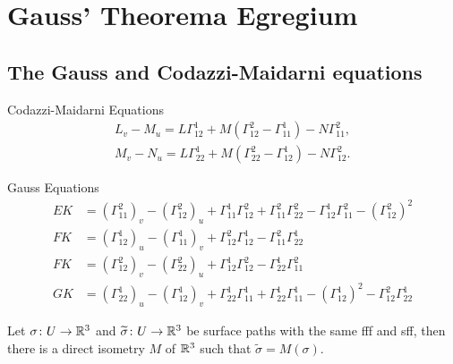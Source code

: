 \section{Gauss' Theorema Egregium} 
\subsection{The Gauss and Codazzi-Maidarni equations}
\begin{namedthm}{Codazzi-Maidarni Equations} 
   \begin{gather}
       L_v-M_u= L \Gamma _{12}^1 +M (\Gamma _{12}^2-\Gamma _{11}^1)-N \Gamma _{11}^2,\\
       M_v-N_u =L \Gamma _{22}^1 + M(\Gamma _{22}^2-\Gamma _{12}^1)-N \Gamma _{12}^2.
   \end{gather} 
\end{namedthm}

\begin{namedthm}{Gauss Equations} 
   \begin{align}
       EK&=(\Gamma _{11}^2)_v - (\Gamma _{12}^2)_u +\Gamma _{11}^1\Gamma _{12}^2+\Gamma _{11}^2\Gamma _{22}^2-\Gamma _{12}^1\Gamma _{11}^2-(\Gamma _{12}^2)^2\\
       FK&=(\Gamma _{12}^1)_u-(\Gamma _{11}^1)_v+\Gamma _{12}^2\Gamma _{12}^1- \Gamma _{11}^2\Gamma _{22}^1\\
       FK&=(\Gamma _{12}^2)_v-(\Gamma _{22}^2)_u+\Gamma _{12}^1\Gamma _{12}^2-\Gamma _{22}^1 \Gamma _{11}^2\\
       GK&=(\Gamma _{22}^1)_u - (\Gamma _{12}^1)_v +\Gamma _{22}^1\Gamma _{11}^1+\Gamma _{22}^1\Gamma _{11}^1-(\Gamma _{12}^1)^2-\Gamma _{12}^2\Gamma _{22}^1
   \end{align} 
\end{namedthm}
\begin{theorem}
    Let $\sigma \colon U \to \mathbb{R}^3$ and $\widetilde \sigma \colon U \to \mathbb{R}^3$ be surface paths with the same fff and sff, then there is a direct isometry $M$ of $\mathbb{R}^3$ such that $\widetilde \sigma=M(\sigma)$.
\end{theorem}

